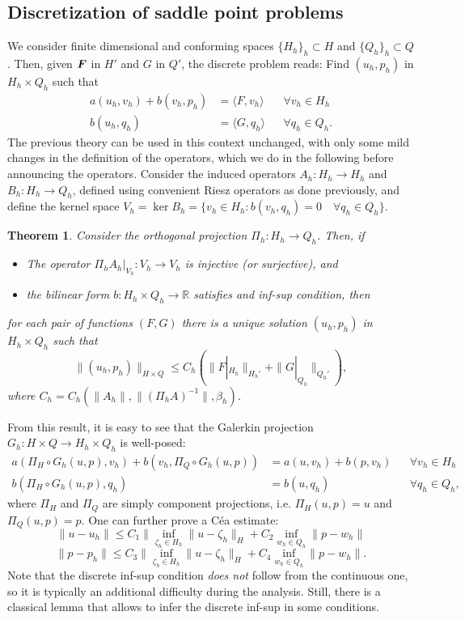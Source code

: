 \documentclass{article}
\renewcommand{\vec}{\vectorsym}
\newcommand{\R}{\mathbb{R}}
\newtheorem{theorem}{Theorem}
\begin{document}
\subsection{Discretization of saddle point problems}
We consider finite dimensional and conforming spaces $\{H_h\}_h \subset H$ and $\{Q_h\}_h \subset Q$. Then, given $\vec F$ in $H'$ and $G$ in $Q'$, the discrete problem reads: Find $(u_h, p_h)$ in $H_h \times Q_h$ such that 
    \[ \begin{aligned}
        a(u_h, v_h) + b(v_h, p_h) &= \langle F, v_h\rangle &&\forall v_h \in H_h \\
        b(u_h, q_h)  &= \langle G, q_h\rangle &&\forall q_h \in Q_h. 
    \end{aligned} \]
The previous theory can be used in this context unchanged, with only some mild changes in the definition of the operators, which we do in the following before announcing the operators. Consider the induced operators $A_h:H_h\to H_h$ and $B_h: H_h\to Q_h$, defined using convenient Riesz operators as done previously, and define the kernel space $V_h = \ker B_h = \{v_h \in H_h: b(v_h, q_h) = 0 \quad\forall q_h \in Q_h\}$. 
\begin{theorem} Consider the orthogonal projection $\Pi_h: H_h \to Q_h$. Then, if 
    \begin{itemize}
        \item The operator $\Pi_h A_h|_{V_h}: V_h\to V_h$ is injective (or surjective), and
        \item the bilinear form $b:H_h\times Q_h\to \R$ satisfies and inf-sup condition, then
    \end{itemize}
for each pair of functions $(F, G)$ there is a unique solution $(u_h, p_h)$ in $H_h\times Q_h$ such that 
    \[ \| (u_h, p_h) \|_{H\times Q} \leq C_h\left( \|F|_{H_h}\|_{H_h'} + \| G|_{Q_h} \|_{Q_h'} \right), \]
where $C_h = C_h(\| A_h\|, \| (\Pi_h A)^{-1} \|, \beta_h)$. 
\end{theorem}
From this result, it is easy to see that the Galerkin projection $G_h: H\times Q \to H_h\times Q_h$ is well-posed: 
    \[\begin{aligned}
        a(\Pi_H \circ G_h(u,p), v_h) + b(v_h, \Pi_Q \circ G_h(u,p)) &= a(u, v_h) + b(p, v_h) && \forall v_h \in H_h\\
        b(\Pi_H \circ G_h(u,p), q_h) &= b(u, q_h) && \forall q_h \in Q_h,
    \end{aligned}\]
where $\Pi_H$ and $\Pi_Q$ are simply component projections, i.e. $\Pi_H(u,p) = u$ and $\Pi_Q(u,p) = p$. One can further prove a Céa estimate: 
    \[ \| u - u_h\| \leq C_1 \|\inf_{\zeta_h \in H_h}\| u -\zeta_h \|_H + C_2\inf_{w_h\in Q_h}\| p -w_h\|\]
    \[ \|p - p_h\| \leq C_3 \|\inf_{\zeta_h \in H_h}\| u -\zeta_h \|_H + C_4\inf_{w_h\in Q_h}\| p -w_h\|.\]
Note that the discrete inf-sup condition \emph{does not} follow from the continuous one, so it is typically an additional difficulty during the analysis. Still, there is a classical lemma that allows to infer the discrete inf-sup in some conditions. 
\end{document}
